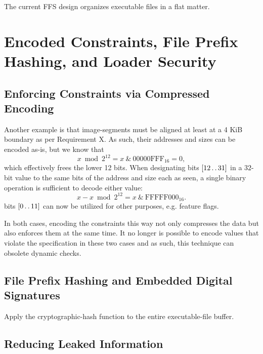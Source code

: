 The current FFS design organizes executable files in a flat matter.

\section{Encoded Constraints, File Prefix Hashing, and Loader Security}

\subsection{Enforcing Constraints via Compressed Encoding}

Another example is that \glspl{image-segment} must be aligned at least at a 4 KiB boundary as per Requirement X. %
As such, their addresses and sizes can be encoded as-is, but we know that
\[ x\bmod 2^{12} = x~\&~\mathrm{00000FFF}_{16} = 0, \]
which effectively frees the lower 12 bits. When designating bits $[12 \mathinner {\ldotp \ldotp} 31]$ in a $32$-bit value to the same bits of the address and size each as seen, a single binary operation is sufficient to decode either value:
\[ x - x\bmod 2^{12} = x~\&~\mathrm{FFFFF000}_{16}. \]
bits $[0 \mathinner {\ldotp \ldotp} 11]$ can now be utilized for other purposes, e.g. feature flags.

In both cases, encoding the constraints this way not only compresses the data but also enforces them at the same time. It no longer is possible to encode values that violate the specification in these two cases and as such, this technique can obsolete dynamic checks.

\subsection{File Prefix Hashing and Embedded Digital Signatures}

\begin{algorithm}
  \caption{Hashing a UE File With an External Signature.}
  \label{algo:dhash}
  \begin{algorithmic}[1]
    \State Apply the \gls{cryptographic-hash} function to the entire \gls{executable-file} buffer.
  \end{algorithmic}
\end{algorithm}

\subsection{Reducing Leaked Information}
\label{sec:reduce_info}

